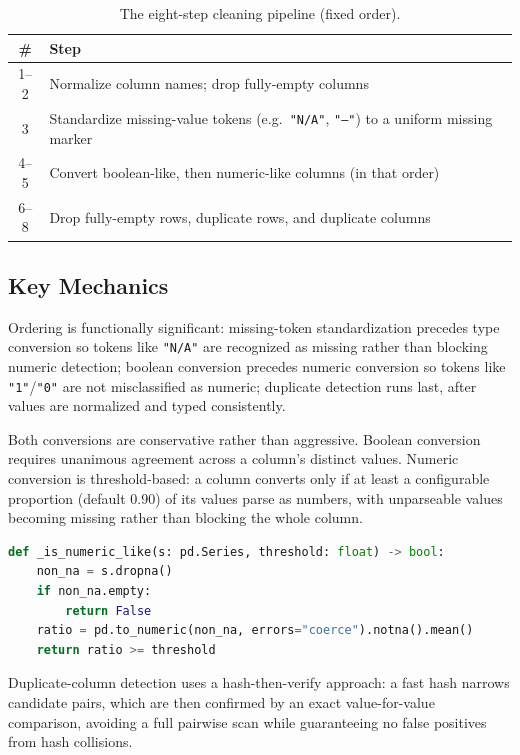 \begin{table}[H]
\centering
\begin{tabularx}{\textwidth}{c X}
\toprule
\textbf{\#} & \textbf{Step} \\
\midrule
1--2 & Normalize column names; drop fully-empty columns \\
3 & Standardize missing-value tokens (e.g.\ \texttt{"N/A"}, \texttt{"--"}) to a uniform missing marker \\
4--5 & Convert boolean-like, then numeric-like columns (in that order) \\
6--8 & Drop fully-empty rows, duplicate rows, and duplicate columns \\
\bottomrule
\end{tabularx}
\caption{The eight-step cleaning pipeline (fixed order).}
\label{tab:cleaning-steps-brief}
\end{table}

\subsection{Key Mechanics}
\label{subsec:cleaning-mechanics}

Ordering is functionally significant: missing-token standardization precedes type conversion so tokens like \texttt{"N/A"} are recognized as missing rather than blocking numeric detection; boolean conversion precedes numeric conversion so tokens like \texttt{"1"}/\texttt{"0"} are not misclassified as numeric; duplicate detection runs last, after values are normalized and typed consistently.

Both conversions are conservative rather than aggressive. Boolean conversion requires unanimous agreement across a column's distinct values. Numeric conversion is threshold-based: a column converts only if at least a configurable proportion (default 0.90) of its values parse as numbers, with unparseable values becoming missing rather than blocking the whole column.

\begin{lstlisting}[language=Python, caption={Threshold-based numeric-like test.}, label={lst:cleaning-numeric-like}]
def _is_numeric_like(s: pd.Series, threshold: float) -> bool:
    non_na = s.dropna()
    if non_na.empty:
        return False
    ratio = pd.to_numeric(non_na, errors="coerce").notna().mean()
    return ratio >= threshold
\end{lstlisting}

Duplicate-column detection uses a hash-then-verify approach: a fast hash narrows candidate pairs, which are then confirmed by an exact value-for-value comparison, avoiding a full pairwise scan while guaranteeing no false positives from hash collisions.


